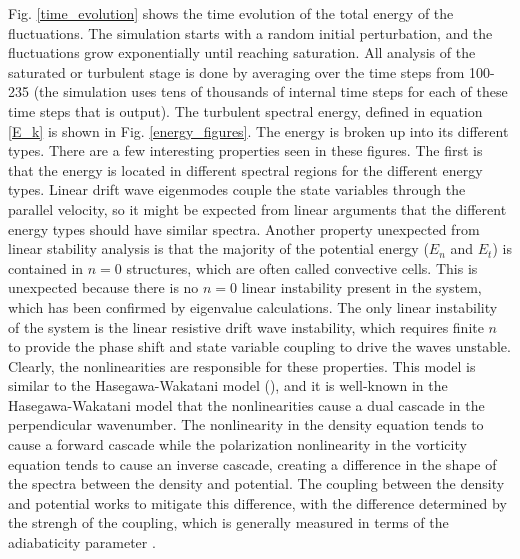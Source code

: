 \documentclass[12pt]{article}
\begin{document}
Fig. \ref{time_evolution} shows the time evolution of the total energy of the fluctuations. The simulation starts with a random initial perturbation, and the fluctuations grow
exponentially until reaching saturation. All analysis of the saturated or turbulent stage is done by averaging over the time steps from 100-235 (the simulation uses tens of thousands of internal
time steps for each of these time steps that is output).
The turbulent spectral energy, defined in equation \ref{E_k} is shown in Fig. \ref{energy_figures}. The energy is broken up into its different types. There are a few interesting properties
seen in these figures. The first is that the energy is located in different spectral regions for the different energy types. Linear drift wave eigenmodes couple the
state variables through the parallel velocity, so it might be expected from linear arguments that the different energy types should have similar spectra. Another
property unexpected from linear stability analysis is that the majority of the potential energy ($E_n$ and $E_t$) is contained in $n=0$ structures, which are often called convective cells.
This is unexpected because there is no $n=0$ linear instability present in the system, which has been confirmed by eigenvalue calculations. The only linear instability of the system is the
linear resistive drift wave instability, which requires finite $n$ to provide the phase shift and state variable coupling to drive the waves unstable. \\

Clearly, the nonlinearities are responsible for these properties. This model is similar to the Hasegawa-Wakatani model (\cite{hasegawa1983}), and it is well-known in the Hasegawa-Wakatani
model that the nonlinearities cause a dual cascade in the perpendicular wavenumber. The nonlinearity in the density equation tends to cause a forward cascade while the 
polarization nonlinearity in the vorticity equation tends to cause an inverse cascade, creating a difference in the shape of the spectra between the density and potential.
The coupling between the density and potential works to mitigate this difference, with the difference determined by the strengh of the coupling, which is generally measured in terms
of the adiabaticity parameter \cite{Camargo1995}. \\
\end{document}
